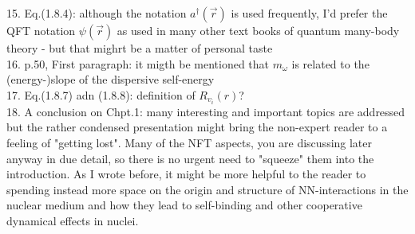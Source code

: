 \documentclass[prl,aps,12pt]{revtex4}
\begin{document}
15. Eq.(1.8.4): although the notation $a^\dag(\vec r)$ is used frequently, I'd prefer the QFT notation $\psi(\vec r)$ as used in many other 
text books of quantum many-body theory - but that mighrt be a matter of personal taste\\
16. p.50, First paragraph: it migth be mentioned that $m_\omega$ is related to the (energy-)slope of the dispersive self-energy\\ 
17. Eq.(1.8.7) adn (1.8.8): definition of $R_{v_i}(r)$?\\
18. A conclusion on Chpt.1: many interesting and important topics are addressed but the rather condensed presentation might 
bring the non-expert reader to a feeling of "getting lost". Many of the NFT aspects, you are discussing later 
anyway in due detail, so there is no urgent need to "squeeze" them into the introduction. As I wrote before, it might be more helpful 
to the reader to spending instead more space on the origin and structure of NN-interactions in the nuclear medium and how they lead to 
self-binding and other cooperative dynamical effects in nuclei.	
	
	
	
\end{document}
